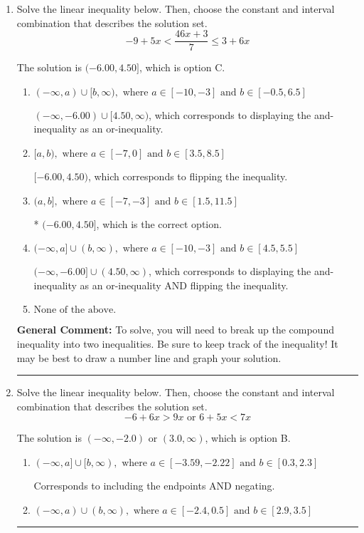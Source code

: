 \documentclass{extbook}[14pt]
\newcommand{\litem}[1]{\item #1

\rule{\textwidth}{0.4pt}}
\begin{document}
\begin{enumerate}\litem{
Solve the linear inequality below. Then, choose the constant and interval combination that describes the solution set.
\[ -9 + 5 x < \frac{46 x + 3}{7} \leq 3 + 6 x \]

The solution is \( (-6.00, 4.50] \), which is option C.\begin{enumerate}[label=\Alph*.]
\item \( (-\infty, a) \cup [b, \infty), \text{ where } a \in [-10, -3] \text{ and } b \in [-0.5, 6.5] \)

$(-\infty, -6.00) \cup [4.50, \infty)$, which corresponds to displaying the and-inequality as an or-inequality.
\item \( [a, b), \text{ where } a \in [-7, 0] \text{ and } b \in [3.5, 8.5] \)

$[-6.00, 4.50)$, which corresponds to flipping the inequality.
\item \( (a, b], \text{ where } a \in [-7, -3] \text{ and } b \in [1.5, 11.5] \)

* $(-6.00, 4.50]$, which is the correct option.
\item \( (-\infty, a] \cup (b, \infty), \text{ where } a \in [-10, -3] \text{ and } b \in [4.5, 5.5] \)

$(-\infty, -6.00] \cup (4.50, \infty)$, which corresponds to displaying the and-inequality as an or-inequality AND flipping the inequality.
\item \( \text{None of the above.} \)


\end{enumerate}

\textbf{General Comment:} To solve, you will need to break up the compound inequality into two inequalities. Be sure to keep track of the inequality! It may be best to draw a number line and graph your solution.
}
\litem{
Solve the linear inequality below. Then, choose the constant and interval combination that describes the solution set.
\[ -6 + 6 x > 9 x \text{ or } 6 + 5 x < 7 x \]

The solution is \( (-\infty, -2.0) \text{ or } (3.0, \infty) \), which is option B.\begin{enumerate}[label=\Alph*.]
\item \( (-\infty, a] \cup [b, \infty), \text{ where } a \in [-3.59, -2.22] \text{ and } b \in [0.3, 2.3] \)

Corresponds to including the endpoints AND negating.
\item \( (-\infty, a) \cup (b, \infty), \text{ where } a \in [-2.4, 0.5] \text{ and } b \in [2.9, 3.5] \)


\end{enumerate}}
\end{enumerate}
\end{document}
